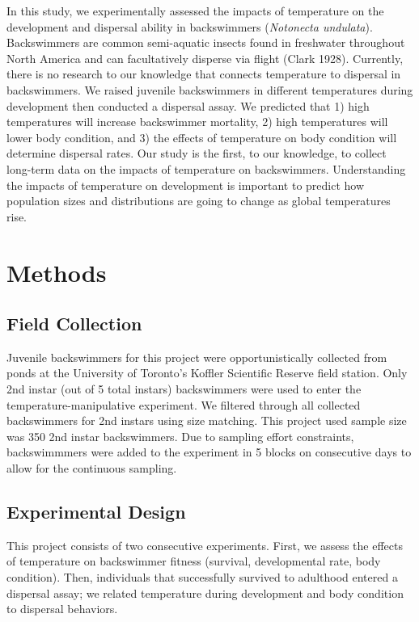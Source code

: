\documentclass[
]{article}
\begin{document}
In this study, we experimentally assessed the impacts of temperature on
the development and dispersal ability in backswimmers (\emph{Notonecta
undulata}). Backswimmers are common semi-aquatic insects found in
freshwater throughout North America and can facultatively disperse via
flight (Clark 1928). Currently, there is no research to our knowledge
that connects temperature to dispersal in backswimmers. We raised
juvenile backswimmers in different temperatures during development then
conducted a dispersal assay. We predicted that 1) high temperatures will
increase backswimmer mortality, 2) high temperatures will lower body
condition, and 3) the effects of temperature on body condition will
determine dispersal rates. Our study is the first, to our knowledge, to
collect long-term data on the impacts of temperature on backswimmers.
Understanding the impacts of temperature on development is important to
predict how population sizes and distributions are going to change as
global temperatures rise.

\section{Methods}\label{methods}

\subsection{Field Collection}\label{field-collection}

Juvenile backswimmers for this project were opportunistically collected
from ponds at the University of Toronto's Koffler Scientific Reserve
field station. Only 2nd instar (out of 5 total instars) backswimmers
were used to enter the temperature-manipulative experiment. We filtered
through all collected backswimmers for 2nd instars using size matching.
This project used sample size was 350 2nd instar backswimmers. Due to
sampling effort constraints, backswimmmers were added to the experiment
in 5 blocks on consecutive days to allow for the continuous sampling.

\subsection{Experimental Design}\label{experimental-design}

This project consists of two consecutive experiments. First, we assess
the effects of temperature on backswimmer fitness (survival,
developmental rate, body condition). Then, individuals that successfully
survived to adulthood entered a dispersal assay; we related temperature
during development and body condition to dispersal behaviors.
\end{document}
